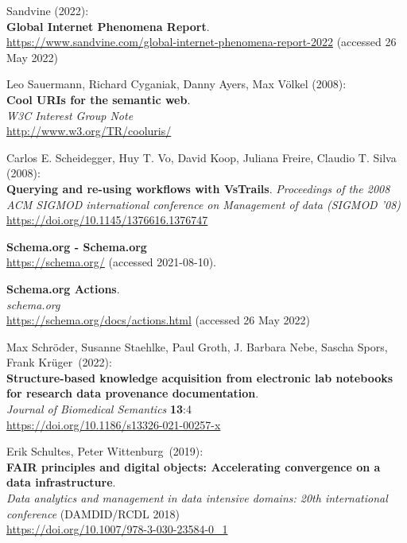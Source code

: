 \begin{thebibliography}{9}
Sandvine (2022): \\
\textbf{Global Internet Phenomena Report}.\\
\url{https://www.sandvine.com/global-internet-phenomena-report-2022}
(accessed 26 May 2022)

Leo Sauermann, Richard Cyganiak, Danny Ayers, Max Völkel (2008): \\
\textbf{Cool URIs for the semantic web}.\\
\emph{W3C Interest Group Note}\\
\url{http://www.w3.org/TR/cooluris/}

 Carlos E. Scheidegger, Huy T. Vo, David Koop, Juliana Freire, Claudio T. Silva (2008):\\
\textbf{Querying and re-using workflows with VsTrails}.
\emph{Proceedings of the 2008 ACM SIGMOD international conference on Management of data (SIGMOD '08)}\\
\url{https://doi.org/10.1145/1376616.1376747}

\textbf{Schema.org - Schema.org}\\
\url{https://schema.org/} (accessed 2021-08-10).

\textbf{Schema.org {Actions}}.\\
\emph{schema.org}\\
\url{https://schema.org/docs/actions.html} (accessed 26 May 2022)

 Max Schröder, Susanne Staehlke, Paul Groth, J.
 Barbara Nebe, Sascha Spors, Frank Krüger~(2022):\\
\textbf{Structure-based knowledge acquisition from electronic lab
notebooks for research data provenance documentation}.\\
\emph{Journal of Biomedical Semantics} \textbf{13}:4\\
\url{https://doi.org/10.1186/s13326-021-00257-x}

Erik Schultes, Peter Wittenburg~(2019):\\
\textbf{FAIR principles and digital objects: Accelerating convergence on
a data infrastructure}.\\
\emph{Data analytics and management in data intensive domains: 20th
international conference} (DAMDID/RCDL 2018)\\
\url{https://doi.org/10.1007/978-3-030-23584-0_1}


\end{thebibliography}
